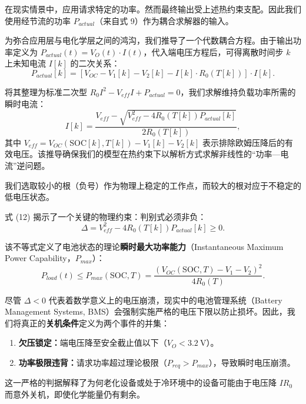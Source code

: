 \documentclass[11pt,a4paper]{ctexart}
\begin{document}
在现实情景中，应用请求特定的功率。然而最终输出受上述热约束支配。因此我们使用经节流的功率 $P_{actual}$（来自式 9）作为耦合求解器的输入。

为弥合应用层与电化学层之间的鸿沟，我们推导了一个代数耦合方程。由于输出功率定义为 $P_{actual}(t)=V_O(t)\cdot I(t)$，代入端电压方程后，可得离散时间步 $k$ 上未知电流 $I[k]$ 的二次关系：
\begin{equation}
P_{actual}[k] = \left[V_{OC}-V_1[k]-V_2[k]-I[k]\cdot R_0(T[k])\right]\cdot I[k].
\end{equation}

将其整理为标准二次型 $R_0I^2-V_{eff}I+P_{actual}=0$，我们求解维持负载功率所需的瞬时电流：
\begin{equation}
I[k] = \frac{V_{eff}-\sqrt{V_{eff}^2-4R_0(T[k])P_{actual}[k]}}{2R_0(T[k])},
\end{equation}
其中 $V_{eff}=V_{OC}(\mathrm{SOC}[k],T[k])-V_1[k]-V_2[k]$ 表示排除欧姆压降后的有效电压。该推导确保我们的模型在热约束下以解析方式求解非线性的“功率—电流”逆问题。

我们选取较小的根（负号）作为物理上稳定的工作点，而较大的根对应于不稳定的低电压状态。

式 (12) 揭示了一个关键的物理约束：判别式必须非负：
\begin{equation}
\Delta = V_{eff}^2-4R_0(T[k])P_{actual}[k]\geq 0.
\end{equation}

该不等式定义了电池状态的理论\textbf{瞬时最大功率能力}（Instantaneous Maximum Power Capability，$P_{max}$）：
\begin{equation}
P_{load}(t)\leq P_{max}(\mathrm{SOC},T)=\frac{\left(V_{OC}(\mathrm{SOC},T)-V_1-V_2\right)^2}{4R_0(T)}.
\end{equation}

尽管 $\Delta<0$ 代表着数学意义上的电压崩溃，现实中的电池管理系统（Battery Management Systems, BMS）会强制实施严格的电压下限以防止损坏。因此，我们将真正的\textbf{关机条件}定义为两个事件的并集：

\begin{enumerate}[leftmargin=1.8em,itemsep=0.2em]
\item \textbf{欠压锁定：}端电压降至安全截止值以下（$V_O<3.2\ \mathrm{V}$）。
\item \textbf{功率极限违背：}请求功率超过理论极限（$P_{req}>P_{max}$），导致瞬时电压崩溃。
\end{enumerate}

这一严格的判据解释了为何老化设备或处于冷环境中的设备可能由于电压降 $IR_0$ 而意外关机，即使化学能量仍有剩余。
\end{document}
